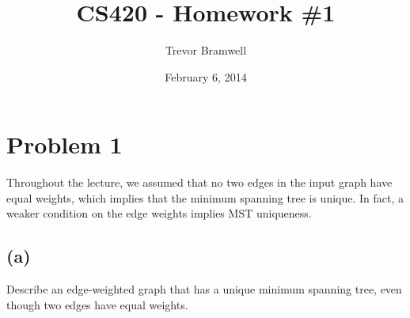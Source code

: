 \documentclass[12pt]{article}
\title{CS420 - Homework \#1}
\author{Trevor Bramwell}
\date{February 6, 2014}
\begin{document}
\maketitle

\section*{Problem 1}

Throughout the lecture, we assumed that no two edges in the input graph
have equal weights, which implies that the minimum spanning tree is
unique. In fact, a weaker condition on the edge weights implies MST
uniqueness.

\subsection*{(a)}
Describe an edge-weighted graph that has a unique minimum spanning tree,
even though two edges have equal weights.

\begin{center}
\end{center}

%
%
%    
%
%
%
\end{document}
